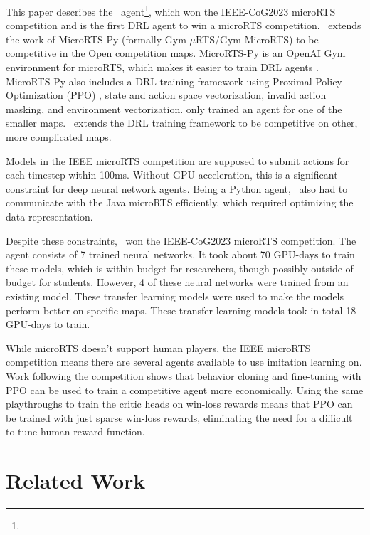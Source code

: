 \documentclass{article}
\begin{document}
This paper describes the \agentName\ agent\footnote{\raiMicroRTSGitHubUrl}, which won the IEEE-CoG2023 microRTS
competition and is the first DRL agent to win a microRTS competition. \agentName\
extends the work of MicroRTS-Py (formally Gym-$\mu$RTS/Gym-MicroRTS) to be competitive
in the Open competition maps. MicroRTS-Py is an OpenAI Gym environment for microRTS,
which makes it easier to train DRL agents \citep{DBLP:journals/corr/abs-2105-13807}.
MicroRTS-Py also includes a DRL training framework using Proximal Policy Optimization
(PPO) \citep{DBLP:journals/corr/SchulmanWDRK17}, state and action space vectorization,
invalid action masking, and environment vectorization.
\citet{DBLP:journals/corr/abs-2105-13807} only trained an agent for one of the smaller
maps. \agentName\ extends the DRL training framework to be competitive on other, more
complicated maps.

Models in the IEEE microRTS competition are supposed to submit actions for each timestep
within 100ms. Without GPU acceleration, this is a significant constraint for deep neural
network agents. Being a Python agent, \agentName\ also had to communicate with the Java
microRTS efficiently, which required optimizing the data representation.

Despite these constraints, \agentName\ won the IEEE-CoG2023 microRTS competition. The
agent consists of 7 trained neural networks. It took about 70 GPU-days to train these
models, which is within budget for researchers, though possibly outside of budget for
students. However, 4 of these neural networks were trained from an existing model. These
transfer learning models were used to make the models perform better on specific maps.
These transfer learning models took in total 18 GPU-days to train.

While microRTS doesn't support human players, the IEEE microRTS competition means there
are several agents available to use imitation learning on. Work following the
competition shows that behavior cloning and fine-tuning with PPO can be used to train a
competitive agent more economically. Using the same playthroughs to train the critic
heads on win-loss rewards means that PPO can be trained with just sparse win-loss
rewards, eliminating the need for a difficult to tune human reward function.

\section{Related Work}
\end{document}
